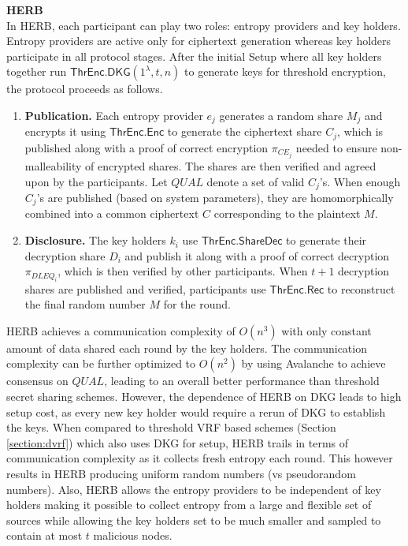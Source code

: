 \documentclass[letterpaper,twocolumn,10pt]{article}
\theoremstyle{definition}
\theoremstyle{remark}
\begin{document}
\textbf{HERB}\\
In HERB, each participant can play two roles: entropy providers and key holders. Entropy providers are active only for ciphertext generation whereas key holders participate in all protocol stages. After the initial Setup where all key holders together run $\mathsf{ThrEnc.DKG}(1^\lambda, t, n)$ to generate keys for threshold encryption, the protocol proceeds as follows.
\begin{enumerate}
    \item \textbf{Publication.} Each entropy provider $e_j$ generates a random share $M_j$ and encrypts it using $\mathsf{ThrEnc.Enc}$ to generate the ciphertext share $C_j$, which is published along with a proof of correct encryption $\pi_{CE_{j}}$ needed to ensure non-malleability of encrypted shares. The shares are then verified and agreed upon by the participants. Let $QUAL$ denote a set of valid $C_j$'s. When enough $C_j$'s are published (based on system parameters), they are homomorphically combined into a common ciphertext $C$ corresponding to the plaintext $M$.
    
    \item \textbf{Disclosure.} The key holders $k_i$ use $\mathsf{ThrEnc.ShareDec}$ to generate their decryption share $D_i$ and publish it along with a proof of correct decryption $\pi_{DLEQ_{i}}$, which is then verified by other participants. When $t+1$ decryption shares are published and verified, participants use $\mathsf{ThrEnc.Rec}$ to reconstruct the final random number $M$ for the round.
\end{enumerate}
HERB achieves a communication complexity of $O(n^3)$ with only constant amount of data shared each round by the key holders. The communication complexity can be further optimized to $O(n^2)$ by using Avalanche \cite{rocket2018snowflake} to achieve consensus on $QUAL$, leading to an overall better performance than threshold secret sharing schemes. However, the dependence of HERB on DKG leads to high setup cost, as every new key holder would require a rerun of DKG to establish the keys. When compared to threshold VRF based schemes (Section \ref{section:dvrf}) which also uses DKG for setup, HERB trails in terms of communication complexity as it collects fresh entropy each round. This however results in HERB producing uniform random numbers (vs pseudorandom numbers). Also, HERB allows the entropy providers to be independent of key holders making it possible to collect entropy from a large and flexible set of sources while allowing the key holders set to be much smaller and sampled to contain at most $t$ malicious nodes.
\end{document}
